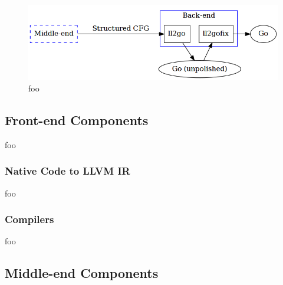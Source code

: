 \begin{figure}[htbp]
	\begin{center}
		\includegraphics[width=\textwidth]{inc/back-end.png}
		\caption{foo}
		\label{fig:back-end}
	\end{center}
\end{figure}


\subsection{Front-end Components}

foo


\subsubsection{Native Code to LLVM IR}

foo


\subsubsection{Compilers}

foo




\subsection{Middle-end Components}

